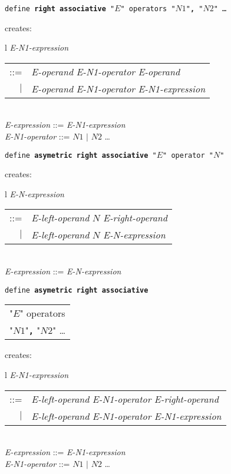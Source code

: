 \documentclass[12pt]{article}
\newcommand{\TT}[1]{{\tt \bfseries #1}}
\newenvironment{indpar}[1][0.3in]%
	{\begin{list}{}%
		     {\setlength{\itemsep}{0in}%
		      \setlength{\topsep}{0in}%
		      \setlength{\parsep}{1ex}%
		      \setlength{\labelwidth}{#1}%
		      \setlength{\leftmargin}{#1}%
		      \addtolength{\leftmargin}{\labelsep}}%
	 \item}%
	{\end{list}}
\begin{document}
\begin{indpar}
{\tt define \TT{right associative} "$E$" operators "$N1$"\TT{,} "$N2$" \ldots}
\begin{indpar}
creates: \begin{tabular}[t]{l}
         {\em E-N1-expression} \begin{tabular}[t]{rl}
                            ::= & {\em E-operand} {\em E-N1-operator}
			          {\em E-operand} \\
                            $|$ & {\em E-operand} {\em E-N1-operator}
			          {\em E-N1-expression} \\
                            \end{tabular} \\
         {\em E-expression} ::= {\em E-N1-expression} \\
         {\em E-N1-operator} ::= $N1$ $|$ $N2$ \ldots \\
	 \end{tabular}
\end{indpar}

{\tt define \TT{asymetric right associative} "$E$" operator "$N$"}
\begin{indpar}
creates: \begin{tabular}[t]{l}
         {\em E-N-expression} \begin{tabular}[t]{rl}
                            ::= & {\em E-left-operand} $N$
			          {\em E-right-operand} \\
                            $|$ & {\em E-left-operand} $N$
			          {\em E-N-expression} \\
                            \end{tabular} \\
         {\em E-expression} ::= {\em E-N-expression} \\
	 \end{tabular}
\end{indpar}

{\tt define \TT{asymetric right associative} \begin{tabular}[t]{l}
                                             "$E$" operators \\
					     "$N1$"\TT{,} "$N2$" \ldots \\
					     \end{tabular}}
\begin{indpar}
creates: \begin{tabular}[t]{l}
         {\em E-N1-expression} \begin{tabular}[t]{rl}
                            ::= & {\em E-left-operand} {\em E-N1-operator}
			          {\em E-right-operand} \\
                            $|$ & {\em E-left-operand} {\em E-N1-operator}
			          {\em E-N1-expression} \\
                            \end{tabular} \\
         {\em E-expression} ::= {\em E-N1-expression} \\
         {\em E-N1-operator} ::= $N1$ $|$ $N2$ \ldots \\
	 \end{tabular}
\end{indpar}


\end{indpar}
\end{document}
